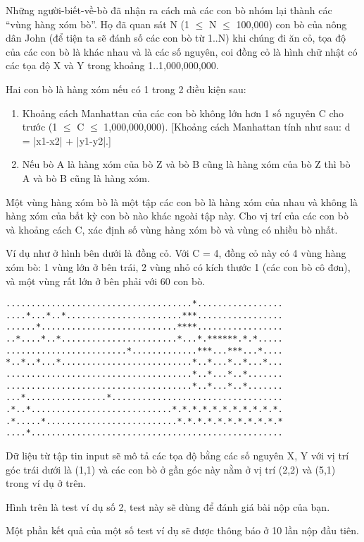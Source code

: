 Những người-biết-về-bò đã nhận ra cách mà các con bò nhóm lại thành  các “vùng hàng xóm bò”. Họ đã quan sát N (1  $\le$  N  $\le$  100,000) con bò của  nông dân John (để tiện ta sẽ đánh số các con bò từ 1..N) khi chúng  đi ăn cỏ, tọa độ của các con bò là khác nhau và là các số nguyên,  coi đồng cỏ là hình chữ nhật có các tọa độ X và Y trong  khoảng 1..1,000,000,000.  

   Hai con bò là hàng xóm nếu có 1 trong 2 điều kiện sau:  
\begin{enumerate}
	\item     Khoảng cách Manhattan của các con bò không lớn hơn 1 số nguyên       C cho trước (1  $\le$  C  $\le$  1,000,000,000). [Khoảng cách Manhattan      tính như sau: d = |x1-x2| + |y1-y2|.]   
	\item     Nếu bò A là hàng xóm của bò Z và bò B cũng là hàng xóm của bò Z       thì bò A và bò B cũng là hàng xóm.   
\end{enumerate}

   Một vùng hàng xóm bò là một tập các con bò là hàng xóm của nhau  và không là hàng xóm của bất kỳ con bò nào khác ngoài tập này. Cho vị trí của các con bò và khoảng cách C, xác định số vùng hàng  xóm bò và vùng có nhiều bò nhất.  

   Ví dụ như ở hình bên dưới là đồng cỏ. Với C = 4, đồng cỏ này có  4 vùng hàng xóm bò: 1 vùng lớn ở bên trái, 2 vùng nhỏ có  kích thước 1 (các con bò cô đơn), và một vùng rất lớn ở bên  phải với 60 con bò.  
\begin{verbatim}
.....................................*.................
....*...*..*.......................***.................
......*...........................****.................
..*....*..*.......................*...*.******.*.*.....
........................*.............***...***...*....
*..*..*...*..........................*..*...*..*...*...
.....................................*..*...*..*.......
.....................................*..*...*..*.......
...*................*..................................
.*..*............................*.*.*.*.*.*.*.*.*.*.*.
.*.....*..........................*.*.*.*.*.*.*.*.*.*.*
....*..................................................
\end{verbatim}

   Dữ liệu từ tập tin input sẽ mô tả các tọa độ bằng các số  nguyên X, Y với vị trí góc trái dưới là (1,1) và các con bò  ở gần góc này nằm ở vị trí (2,2) và (5,1) trong ví dụ ở trên.  

   Hình trên là test ví dụ số 2, test này sẽ dùng để đánh giá  bài nộp của bạn.  

   Một phần kết quả của một số test ví dụ sẽ được thông báo ở 10  lần nộp đầu tiên.
